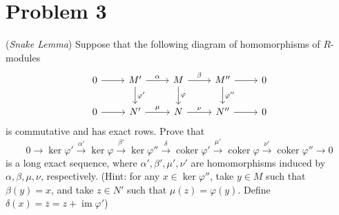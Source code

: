 \documentclass[12pt, a4paper]{article}
\theoremstyle{remark}
\begin{document}
\section*{Problem 3}
(\textit{Snake Lemma}) Suppose that the following diagram of homomorphisms of $R$-modules
\[\begin{tikzcd}
    0 \arrow[r] & M' \arrow[r, "\alpha"] \arrow[d, "\varphi'"] & M \arrow[r, "\beta"] \arrow[d, "\varphi"] & M'' \arrow[r] \arrow[d, "\varphi''"] & 0 \\
    0 \arrow[r] & N' \arrow[r, "\mu"] & N \arrow[r, "\nu"] & N'' \arrow[r] & 0
\end{tikzcd}\]
is commutative and has exact rows. Prove that
\[ 0 \to \ker\varphi' \xrightarrow{\alpha'} \ker\varphi \xrightarrow{\beta'} \ker\varphi'' \xrightarrow{\delta} \operatorname{coker}\varphi' \xrightarrow{\mu'} \operatorname{coker}\varphi \xrightarrow{\nu'} \operatorname{coker}\varphi'' \to 0 \]
is a long exact sequence, where $\alpha', \beta', \mu', \nu'$ are homomorphisms induced by $\alpha, \beta, \mu, \nu$, respectively. (Hint: for any $x \in \ker\varphi''$, take $y \in M$ such that $\beta(y) = x$, and take $z \in N'$ such that $\mu(z) = \varphi(y)$. Define $\delta(x) = \overline{z} = z + \operatorname{im}\varphi'$)
\end{document}
